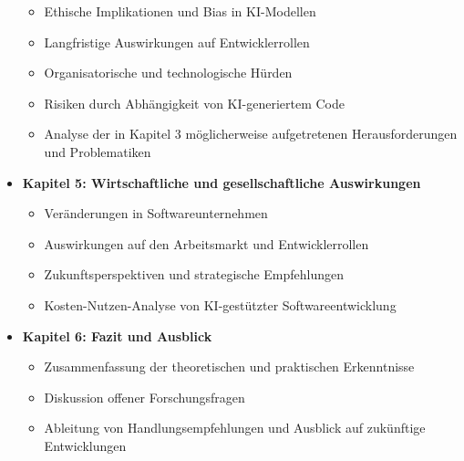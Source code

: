 \begin{itemize}
\begin{itemize}
            \item Ethische Implikationen und Bias in KI-Modellen
            \item Langfristige Auswirkungen auf Entwicklerrollen
            \item Organisatorische und technologische Hürden
            \item Risiken durch Abhängigkeit von KI-generiertem Code
            \item Analyse der in Kapitel 3 möglicherweise aufgetretenen Herausforderungen und Problematiken
        \end{itemize}
    \item \textbf{Kapitel 5:  Wirtschaftliche und gesellschaftliche Auswirkungen} 
        \begin{itemize}
            \item Veränderungen in Softwareunternehmen
            \item Auswirkungen auf den Arbeitsmarkt und Entwicklerrollen
            \item Zukunftsperspektiven und strategische Empfehlungen
            \item Kosten-Nutzen-Analyse von KI-gestützter Softwareentwicklung
        \end{itemize}
    \item \textbf{Kapitel 6: Fazit und Ausblick} 
        \begin{itemize}
            \item Zusammenfassung der theoretischen und praktischen Erkenntnisse
            \item Diskussion offener Forschungsfragen
            \item Ableitung von Handlungsempfehlungen und Ausblick auf zukünftige Entwicklungen
        \end{itemize}
\end{itemize}